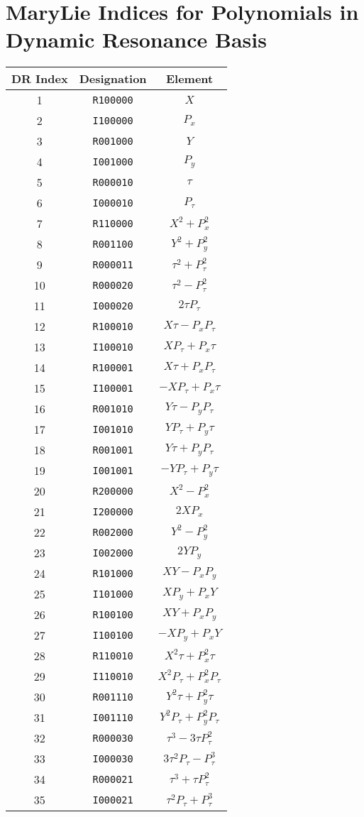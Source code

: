 {\clearpage

\section{MaryLie Indices for Polynomials in Dynamic Resonance Basis}
{\rm
\begin{center}
\begin{tabular}{ccc}
DR Index&Designation&Element\\ \hline
    1&{\tt R100000}&$X$\\
    2&{\tt I100000}&$P_x$\\
    3&{\tt R001000}&$Y$\\
    4&{\tt I001000}&$P_y$\\
    5&{\tt R000010}&${\tau}$\\
    6&{\tt I000010}&$P_{\tau}$\\
    7&{\tt R110000}&$X^2+P_x^2$\\
    8&{\tt R001100}&$Y^2+P_y^2$\\
    9&{\tt R000011}&${\tau}^2+P_{\tau}^2$\\
   10&{\tt R000020}&${\tau}^2-P_{\tau}^2$\\
   11&{\tt I000020}&$2{\tau}P_{\tau}$\\
   12&{\tt R100010}&$X{\tau}-P_xP_{\tau}$\\
   13&{\tt I100010}&$XP_{\tau}+P_x{\tau}$\\
   14&{\tt R100001}&$X{\tau}+P_xP_{\tau}$\\
   15&{\tt I100001}&$-XP_{\tau}+P_x{\tau}$\\
   16&{\tt R001010}&$Y{\tau}-P_yP_{\tau}$\\
   17&{\tt I001010}&$YP_{\tau}+P_y{\tau}$\\
   18&{\tt R001001}&$Y{\tau}+P_yP_{\tau}$\\
   19&{\tt I001001}&$-YP_{\tau}+P_y{\tau}$\\
   20&{\tt R200000}&$X^2-P_x^2$\\
   21&{\tt I200000}&$2XP_x$\\
   22&{\tt R002000}&$Y^2-P_y^2$\\
   23&{\tt I002000}&$2YP_y$\\
   24&{\tt R101000}&$XY-P_xP_y$\\
   25&{\tt I101000}&$XP_y+P_xY$\\
   26&{\tt R100100}&$XY+P_xP_y$\\
   27&{\tt I100100}&$-XP_y+P_xY$\\
   28&{\tt R110010}&$X^2{\tau}+P_x^2{\tau}$\\
   29&{\tt I110010}&$X^2P_{\tau}+P_x^2P_{\tau}$\\
   30&{\tt R001110}&$Y^2{\tau}+P_y^2{\tau}$\\
   31&{\tt I001110}&$Y^2P_{\tau}+P_y^2P_{\tau}$\\
   32&{\tt R000030}&${\tau}^3-3{\tau}P_{\tau}^2$\\
   33&{\tt I000030}&$3{\tau}^{2}P_{\tau}-P_{\tau}^{3}$\\
   34&{\tt R000021}&${\tau}^{3}+{\tau}P_{\tau}^{2}$\\
   35&{\tt I000021}&${\tau}^{2}P_{\tau}+P_{\tau}^{3}$
\end{tabular}



\end{center}}}
